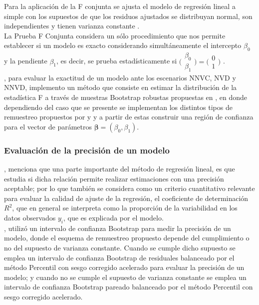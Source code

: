 Para la aplicación de la F conjunta se ajusta el modelo de regresión lineal a simple con los supuestos de que los residuos ajustados se distribuyan normal, son independientes y tienen varianza constante \parencite{ayala-2024}.\\

La Prueba F Conjunta considera un sólo procedimiento que nos permite establecer si un modelo es exacto considerando simultáneamente el intercepto \(\beta_0\) y la pendiente \(\beta_1\), es decir, se prueba estadísticamente si  {\Large $\bigl(\begin{smallmatrix} \beta_{0} \\ \beta_{1} \end{smallmatrix}\bigr) = \bigl(\begin{smallmatrix}0  \\  1\end{smallmatrix}\bigr) $} \parencite{zacarias-2023}.\\

\textcite{zacarias-2023}, para evaluar la exactitud de un modelo ante los escenarios NNVC, NVD y NNVD, implemento un método que consiste en estimar la distribución de la estadística F a través de muestras Bootstrap robustas propuestas en \textcite{rana-2012}, en donde dependiendo del caso que se presente se implementan los distintos tipos de remuestreo propuestos por \textcite{wu-1986} y \textcite{liu-1988} y a partir de estas construir una región de confianza para el vector de parámetros $ \mathbf{\beta} = (\beta_{0}, \beta_{1})$.\\


\subsubsection{Evaluación de la precisión de un modelo}

\textcite{zacarias-2023}, menciona que una parte importante del método de regresión lineal, es que estudia si dicha relación permite realizar estimaciones con una precisión aceptable; por lo que también se considera como un criterio cuantitativo relevante para evaluar la calidad de ajuste de la regresión, el coeficiente de determinación $R^{2}$, que en general se interpreta como la proporción de la variabilidad en los datos observados $y_{i}$, que es explicada por el modelo.\\


\textcite{balam-2012}, utilizó un intervalo de confianza Bootstrap para medir la precisión de un modelo, donde el esquema de remuestreo propuesto depende del cumplimiento o no del supuesto de varianza constante. Cuando se cumple dicho supuesto se emplea un intervalo de confianza Bootstrap de residuales balanceado por el método Percentil con sesgo corregido acelerado para evaluar la precisión de un modelo; y cuando no se cumple el supuesto de varianza constante se emplea un intervalo de confianza Bootstrap pareado balanceado por el método Percentil con sesgo corregido acelerado.\\

